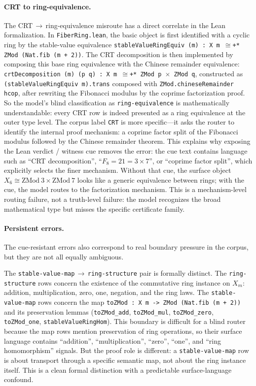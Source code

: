 \documentclass[11pt]{article}
\begin{document}
\paragraph{CRT to ring-equivalence.}
The CRT\,$\to$\,ring-equivalence misroute has a direct correlate in the Lean
formalization.
In \texttt{FiberRing.lean}, the basic object is first identified with a
cyclic ring by the stable-value equivalence
\texttt{stableValueRingEquiv (m) : X m $\cong$+* ZMod (Nat.fib (m + 2))}.
The CRT decomposition is then implemented by composing this base ring
equivalence with the Chinese remainder equivalence:
\texttt{crtDecomposition (m) (p q) : X m $\cong$+* ZMod p $\times$ ZMod q},
constructed as
\texttt{(stableValueRingEquiv m).trans} composed with
\texttt{ZMod.chineseRemainder hcop}, after rewriting the Fibonacci modulus by
the coprime factorization proof.
So the model's blind classification as \texttt{ring-equivalence} is
mathematically understandable: every CRT row is indeed presented as a ring
equivalence at the outer type level.
The corpus label \texttt{CRT} is more specific---it asks the router to
identify the internal proof mechanism: a coprime factor split of the
Fibonacci modulus followed by the Chinese remainder theorem.
This explains why exposing the Lean verdict / witness cue removes the
error: the cue text contains language such as ``CRT decomposition'',
``$F_8 = 21 = 3 \times 7$'', or ``coprime factor split'', which explicitly
selects the finer mechanism.
Without that cue, the surface object $X_6 \cong \mathrm{ZMod}\ 3 \times
\mathrm{ZMod}\ 7$ looks like a generic equivalence between rings;
with the cue, the model routes to the factorization mechanism.
This is a mechanism-level routing failure, not a truth-level failure: the
model recognizes the broad mathematical type but misses the specific
certificate family.

\paragraph{Persistent errors.}
The cue-resistant errors also correspond to real boundary pressure in the
corpus, but they are not all equally ambiguous.

The \texttt{stable{-}value{-}map}\,$\to$\,\texttt{ring{-}structure} pair is
formally distinct.
The \texttt{ring-structure} rows concern the existence of the commutative
ring instance on $X_m$: addition, multiplication, zero, one, negation, and
the ring laws.
The \texttt{stable-value-map} rows concern the map
\texttt{toZMod : X m -> ZMod (Nat.fib (m + 2))} and its preservation lemmas
(\texttt{toZMod\_add}, \texttt{toZMod\_mul}, \texttt{toZMod\_zero},
\texttt{toZMod\_one}, \texttt{stableValueRingHom}).
This boundary is difficult for a blind router because the map rows mention
preservation of ring operations, so their surface language contains
``addition'', ``multiplication'', ``zero'', ``one'', and ``ring
homomorphism'' signals.
But the proof role is different: a \texttt{stable-value-map} row is about
transport through a specific semantic map, not about the ring instance
itself.
This is a clean formal distinction with a predictable surface-language
confound.
\end{document}
